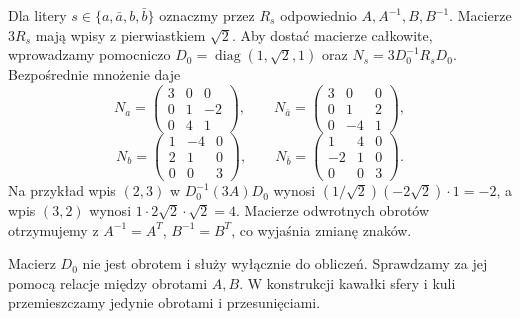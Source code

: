 Dla litery $s\in\{a,\bar a,b,\bar b\}$ oznaczmy przez $R_s$ odpowiednio $A,A^{-1},B,B^{-1}$. Macierze $3R_s$ mają wpisy z pierwiastkiem $\sqrt2$. Aby dostać macierze całkowite, wprowadzamy pomocniczo $D_0=\operatorname{diag}(1,\sqrt2,1)$ oraz $N_s=3D_0^{-1}R_sD_0$. Bezpośrednie mnożenie daje
\begin{equation}\label{eq:5-2}
 N_a=\begin{pmatrix}3&0&0\\0&1&-2\\0&4&1\end{pmatrix},\qquad
 N_{\bar a}=\begin{pmatrix}3&0&0\\0&1&2\\0&-4&1\end{pmatrix},
\end{equation}
\begin{equation}\label{eq:5-3}
 N_b=\begin{pmatrix}1&-4&0\\2&1&0\\0&0&3\end{pmatrix},\qquad
 N_{\bar b}=\begin{pmatrix}1&4&0\\-2&1&0\\0&0&3\end{pmatrix}.
\end{equation}
Na przykład wpis $(2,3)$ w $D_0^{-1}(3A)D_0$ wynosi $(1/\sqrt2)(-2\sqrt2)\cdot1=-2$, a wpis $(3,2)$ wynosi $1\cdot2\sqrt2\cdot\sqrt2=4$. Macierze odwrotnych obrotów otrzymujemy z $A^{-1}=A^T$, $B^{-1}=B^T$, co wyjaśnia zmianę znaków.
\begin{uwaga}
Macierz $D_0$ nie jest obrotem i służy wyłącznie do obliczeń. Sprawdzamy za jej pomocą relacje między obrotami $A,B$. W konstrukcji kawałki sfery i kuli przemieszczamy jedynie obrotami i przesunięciami.
\end{uwaga}

